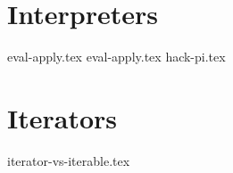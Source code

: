 \documentclass{exam}
\begin{document}
\begin{questions}
\section{Interpreters}
{eval-apply.tex}
{eval-apply.tex}
{hack-pi.tex}


\section{Iterators}
{iterator-vs-iterable.tex}



\end{questions}








\end{document}
